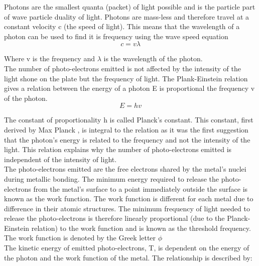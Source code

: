 \documentclass[12pt]{article}
\begin{document}
Photons are the smallest quanta (packet) of light possible and is the particle part of wave particle duality of light. Photons are mass-less and therefore travel at a constant velocity c (the speed of light). This means that the wavelength of a photon can be used to find it is frequency using the wave
speed equation\\

    \begin{equation}
    c=v\lambda
    \end{equation}
    
Where v is the frequency and $\lambda$ is the wavelength of the photon.
\\The number of photo-electrons emitted is not affected by the intensity of the light shone on the plate but the frequency of light. The Plank-Einstein relation gives a relation between the energy of a photon E is proportional the frequency v of the photon. \cite{statistical mechanics}\\

 \begin{equation}
     E=hv
 \end{equation}
 
The constant of proportionality h is called Planck’s constant. This constant, first derived by Max Planck \cite{Planck}, is integral to the relation as it was the first suggestion that the photon’s energy is related to the frequency and not the intensity of the light. This relation explains why the number of photo-electrons emitted is independent of the intensity of light.\\

The photo-electrons emitted are the free electrons shared by the metal’s nuclei during metallic bonding. The minimum energy required to release the photo-electrons from the metal’s surface to a point immediately outside the surface is known as the work function. The work function is different for each metal due to difference in their atomic structures. The minimum frequency of light needed to release the photo-electrons is therefore linearly proportional (due to the Planck-Einstein relation) to the work function and is known as the threshold frequency. The work function is denoted by the Greek letter $\phi$\\

The kinetic energy of emitted photo-electrons, T, is dependent on the energy of the photon and the work function of the metal. The relationship is described by: \cite{university physics}
\end{document}
